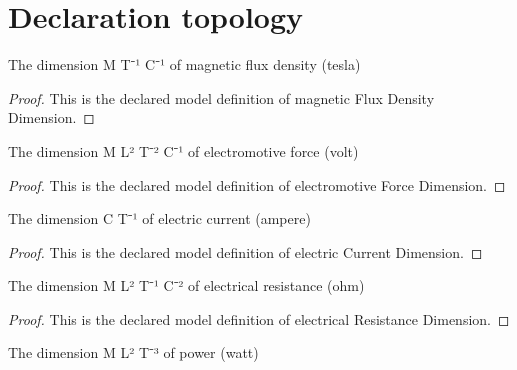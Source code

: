 \section{Declaration topology}
\begin{definition}
  \label{def:physics:phyx-mini-0919:phyxminiproblems-problemphyxmini0919-magneticfluxdensitydimension}
  The dimension M T⁻¹ C⁻¹ of magnetic flux density (tesla)
\end{definition}
\begin{proof}
  This is the declared model definition of magnetic Flux Density Dimension.
\end{proof}
\begin{definition}
  \label{def:physics:phyx-mini-0919:phyxminiproblems-problemphyxmini0919-electromotiveforcedimension}
  The dimension M L² T⁻² C⁻¹ of electromotive force (volt)
\end{definition}
\begin{proof}
  This is the declared model definition of electromotive Force Dimension.
\end{proof}
\begin{definition}
  \label{def:physics:phyx-mini-0919:phyxminiproblems-problemphyxmini0919-electriccurrentdimension}
  The dimension C T⁻¹ of electric current (ampere)
\end{definition}
\begin{proof}
  This is the declared model definition of electric Current Dimension.
\end{proof}
\begin{definition}
  \label{def:physics:phyx-mini-0919:phyxminiproblems-problemphyxmini0919-electricalresistancedimension}
  The dimension M L² T⁻¹ C⁻² of electrical resistance (ohm)
\end{definition}
\begin{proof}
  This is the declared model definition of electrical Resistance Dimension.
\end{proof}
\begin{definition}
  \label{def:physics:phyx-mini-0919:phyxminiproblems-problemphyxmini0919-powerdimension}
  The dimension M L² T⁻³ of power (watt)
\end{definition}
